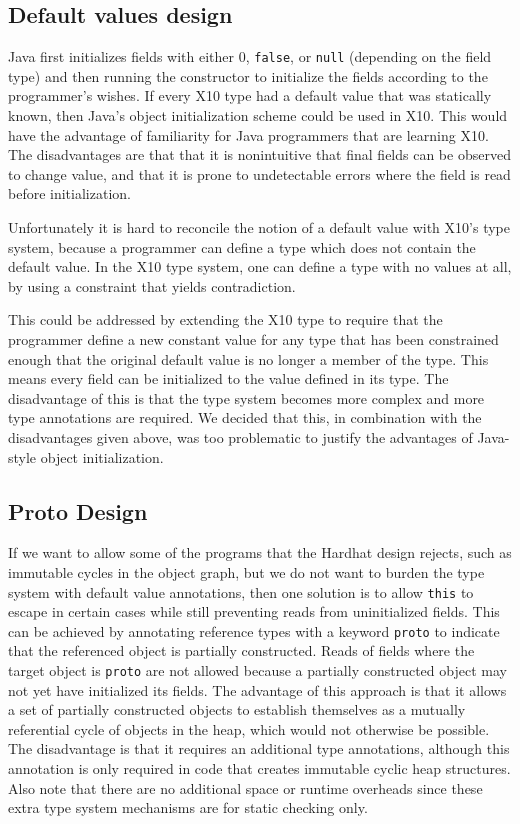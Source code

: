 

\subsection{Default values design}

Java first initializes fields with either $0$, \texttt{false}, or \texttt{null}
(depending on the field type) and then running the constructor to initialize
the fields according to the programmer's wishes.  If every X10 type had a
default value that was statically known, then Java's object initialization
scheme could be used in X10.  This would have the advantage of familiarity for
Java programmers that are learning X10.  The disadvantages are that that it is
nonintuitive that final fields can be observed to change value, and that it is
prone to undetectable errors where the field is read before initialization.

Unfortunately it is hard to reconcile the notion of a default value with X10's
type system, because a programmer can define a type which does not contain the
default value.  In the X10 type system, one can define a type with no values at
all, by using a constraint that yields contradiction.

This could be addressed by extending the X10 type to require that the
programmer define a new constant value for any type that has been constrained
enough that the original default value is no longer a member of the type.  This
means every field can be initialized to the value defined in its type.  The
disadvantage of this is that the type system becomes more complex and more type
annotations are required.  We decided that this, in combination with the
disadvantages given above, was too problematic to justify the advantages of
Java-style object initialization.

\subsection{Proto Design}

If we want to allow some of the programs that the Hardhat design rejects, such
as immutable cycles in the object graph, but we do not want to burden the type
system with default value annotations, then one solution is to allow
\texttt{this} to escape in certain cases while still preventing reads from
uninitialized fields.  This can be achieved by annotating reference types with
a keyword \texttt{proto} to indicate that the referenced object is partially
constructed.  Reads of fields where the target object is \texttt{proto}
are not allowed because a partially constructed object may not yet have
initialized its fields.  The advantage of this approach is that it allows a set
of partially constructed objects to establish themselves as a mutually
referential cycle of objects in the heap, which would not otherwise be possible.
The disadvantage is that it requires an additional type annotations, although this
annotation is only required in code that creates immutable cyclic heap
structures.  Also note that there are no additional space or runtime overheads
since these extra type system mechanisms are for static checking only.

